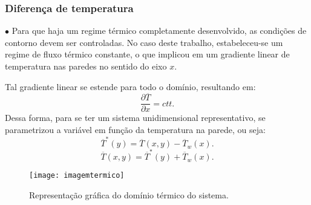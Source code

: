 \documentclass[xcolor=dvipsnames,10pt,aspectratio=169]{beamer}
\begin{document}
		\begin{frame}
			\frametitle{Diferença de temperatura}
			$\bullet$ Para que haja um regime térmico completamente desenvolvido, as condições de contorno devem ser controladas. No caso deste trabalho, estabeleceu-se um regime de fluxo térmico constante, o que implicou em um gradiente linear de temperatura nas paredes no sentido do eixo $x$.  \\
			\begin{minipage}[h!]{0.36\textwidth}
				Tal gradiente linear se estende para todo o domínio, resultando em:
				\begin{equation}
				\frac{\partial \overline{T}}{\partial x} = ctt.
				\end{equation}
				Dessa forma, para se ter um sistema unidimensional representativo, se parametrizou a variável em função da temperatura na parede, ou seja:
				\begin{equation}
				\overline{T}^\ast(y) = \overline{T}(x,y)  - \overline{T}_w(x) .
				\end{equation}
				\begin{equation}
				\overline{T}(x,y) = \overline{T}^\ast(y) + \overline{T}_w(x).
				\end{equation}
			\end{minipage}\hfill
			\begin{minipage}[h!]{0.60\textwidth}
			\begin{figure}
				\centering
				\texttt{[image: imagemtermico]}
				\caption{Representação gráfica do domínio térmico do sistema.}
				\label{temperatura}
			\end{figure}
			\end{minipage}
		\end{frame}
		
		
		
		
		
\end{document}

